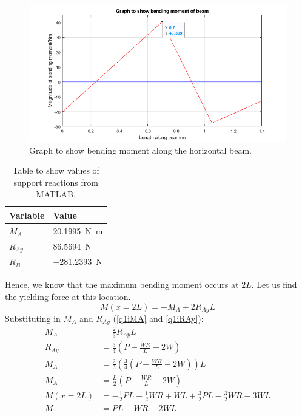 \documentclass[11pt]{article}
\numberwithin{equation}{section}
\begin{document}
\begin{figure}[H]
    \centering
    \includegraphics[width = \textwidth]{./img/q1iii2.png}
    \caption{Graph to show bending moment along the horizontal beam.}
    \label{fig:q1iii}
\end{figure}
\begin{table}[H]
    \centering
    \begin{tabular}{ll}
        \toprule
        Variable & Value\\
        \midrule
        $M_A$ & \SI{20.1995}{\newton\meter}\\
        $R_{Ay}$ & \SI{86.5694}{\newton}\\
        $R_B$ & \SI{-281.2393}{\newton}\\
        \bottomrule
    \end{tabular}
    \caption{Table to show values of support reactions from MATLAB.}
    \label{tab:supportReactions}
\end{table}
Hence, we know that the maximum bending moment occurs at $2L$. Let us find the yielding force at this location.
\begin{equation}
    M(x = 2L) = -M_A + 2R_{Ay}L
\end{equation}
Substituting in $M_A$ and $R_{Ay}$ (\ref{q1iMA} and \ref{q1iRAy}):
\begin{align}
    M_A &= \frac{2}{3}R_{Ay}L\\
    R_{Ay} &= \frac{3}{4}\left(P - \frac{WR}{L}-2W\right)\\
    M_A &= \frac{2}{3}\left(\frac{3}{4}\left(P - \frac{WR}{L}-2W\right)\right)L\\
    M_A &= \frac{L}{2} \left(P - \frac{WR}{L}-2W\right)\\
    M(x=2L) &= -\frac{1}{2}PL + \frac{1}{2}WR + WL + \frac{3}{2}PL - \frac{3}{2}WR - 3WL\\
    M &= PL - WR - 2WL
\end{align}
\end{document}
